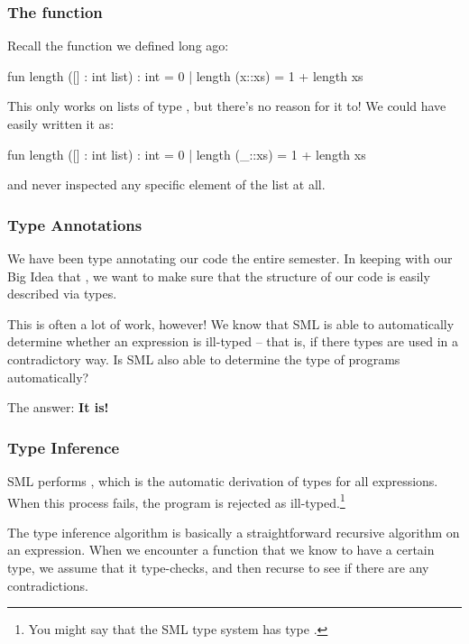 \documentclass[aspectratio=169]{beamer}
\begin{document}
\begin{frame}[fragile]
  \frametitle{The  function}

  Recall the  function we defined long ago:

  \pause
  \begin{codeblock}
    fun length ([] : int list) : int = 0
      | length (x::xs) = 1 + length xs
  \end{codeblock}

  \pause
  \vspace{\fill}

  This only works on lists of type , but there's no reason for it
  to! We could have easily written it as:

  \pause
  \begin{codeblock}
    fun length ([] : int list) : int = 0
      | length (_::xs) = 1 + length xs
  \end{codeblock}

  and never inspected any specific element of the list at all.
\end{frame}

\begin{frame}[fragile]
  \frametitle{Type Annotations}

  \tgs

  We have been type annotating our code the entire semester. In keeping with
  our Big Idea that , we want to make sure that
  the structure of our code is easily described via types.

  \pause
  \vspace{\fill}

  This is often a lot of work, however! We know that SML is able to automatically
  determine whether an expression is ill-typed -- that is, if there types are
  used in a contradictory way. Is SML also able to determine the type of programs
  automatically?

  \pause
  \vspace{\fill}

  The answer: \textbf{It is!}
\end{frame}

\begin{frame}[fragile]
  \frametitle{Type Inference}

  SML performs , which is the automatic derivation of
  types for all expressions. When this process fails, the program is rejected
  as ill-typed.\footnote{
    You might say that the SML type system has type .
  }

  \pause
  \vspace{\fill}

  The type inference algorithm is basically a straightforward recursive
  algorithm on an expression. When we encounter a function that we know to have
  a certain type, we assume that it type-checks, and then recurse to see
  if there are any contradictions.
\end{frame}
\end{document}
